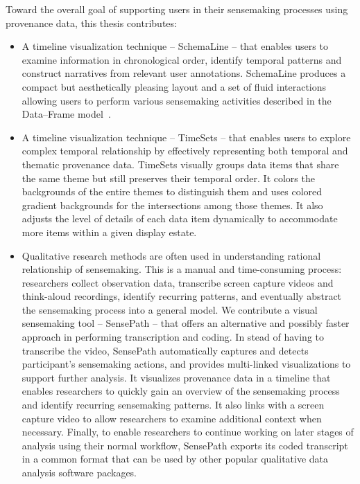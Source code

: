 Toward the overall goal of supporting users in their sensemaking processes using provenance data, this thesis contributes:
\begin{itemize}
	\item A timeline visualization technique -- SchemaLine -- that enables users to examine information in chronological order, identify temporal patterns and construct narratives from relevant user annotations. SchemaLine produces a compact but aesthetically pleasing layout and a set of fluid interactions allowing users to perform various sensemaking activities described in the Data--Frame model~\cite{Klein2003}.
	
	\item A timeline visualization technique -- TimeSets -- that enables users to explore complex temporal relationship by effectively representing both temporal and thematic provenance data. TimeSets visually groups data items that share the same theme but still preserves their temporal order. It colors the backgrounds of the entire themes to distinguish them and uses colored gradient backgrounds for the intersections among those themes. It also adjusts the level of details of each data item dynamically to accommodate more items within a given display estate. 
	
	\item Qualitative research methods are often used in understanding rational relationship of sensemaking. This is a manual and time-consuming process: researchers collect observation data, transcribe screen capture videos and think-aloud recordings, identify recurring patterns, and eventually abstract the sensemaking process into a general model. We contribute a visual sensemaking tool -- SensePath -- that offers an alternative and possibly faster approach in performing transcription and coding. In stead of having to transcribe the video, SensePath automatically captures and detects participant's sensemaking actions, and provides multi-linked visualizations to support further analysis. It visualizes provenance data in a timeline that enables researchers to quickly gain an overview of the sensemaking process and identify recurring sensemaking patterns. It also links with a screen capture video to allow researchers to examine  additional context when necessary. Finally, to enable researchers to continue working on later stages of analysis using their normal workflow, SensePath exports its coded transcript in a common format that can be used by other popular qualitative data analysis software packages.	
	

\end{itemize}
